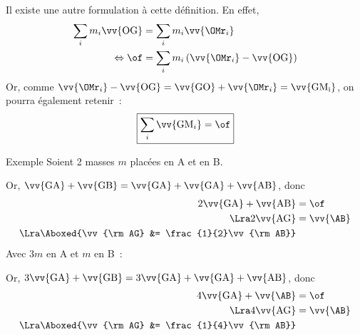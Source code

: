 \documentclass[../main/main.tex]{subfiles}
\begin{document}
Il existe une autre formulation à cette définition. En effet,
\begin{align*}
    \sum_i m_i\vv{\rm OG} &= \sum_i m_i\vv{\OMr_i}
    \\
    \Leftrightarrow
    \of &= \sum_i m_i \left( \vv{\OMr_i} - \vv{\rm OG} \right)
\end{align*}
Or, comme $\vv{\OMr_i} - \vv{\rm OG} = \vv{\rm GO} + \vv{\OMr_i} = \vv{\rm
GM_i}$, on pourra également retenir~:
\[\boxed{\sum_i \vv{{\rm GM}_i} = \of}\]

\begin{rexem}{Exemple}
    Soient 2 masses $m$ placées en A et en B.
    \begin{center}
    \end{center}

    Or, $\vv{\rm GA} + \vv{\rm GB} = \vv{\rm GA} + \vv{\rm GA} + \vv{\rm AB}$,
    donc
    \begin{align*}
        2\vv{\rm GA} + \vv{\rm AB} &= \of
        \\
        \Lra
        2\vv{\rm AG} &= \vv{\AB}
        \\
        \Lra
        \Aboxed{\vv{\rm AG} &= \frac{1}{2}\vv{\rm AB}}
    \end{align*}
    Avec $3m$ en A et $m$ en B~:
    \begin{center}
    \end{center}

    Or, $3\vv{\rm GA} + \vv{\rm GB} = 3\vv{\rm GA} + \vv{\rm GA} + \vv{\rm AB}$,
    donc
    \begin{align*}
        4\vv{\rm GA} + \vv{\AB} &= \of
        \\
        \Lra
        4\vv{\rm AG} &= \vv{\AB}
        \\
        \Lra
        \Aboxed{\vv{\rm AG} &= \frac{1}{4}\vv{\rm AB}}
    \end{align*}
\end{rexem}
\end{document}
